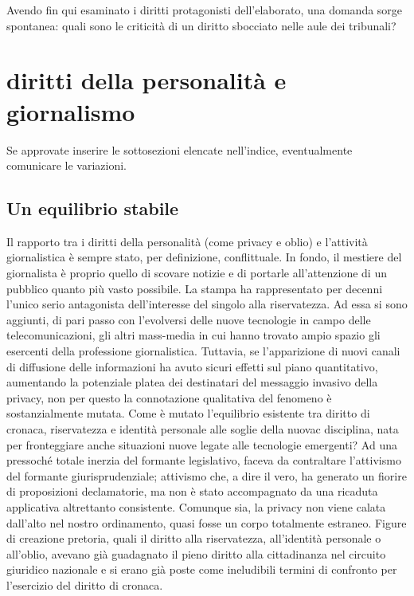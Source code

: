Avendo fin qui esaminato i diritti protagonisti dell'elaborato, una domanda sorge spontanea: quali sono le criticità di un diritto sbocciato nelle aule dei tribunali?



\section{diritti della personalità e giornalismo}
Se approvate inserire le sottosezioni elencate nell'indice, eventualmente comunicare le variazioni.

\subsection{Un equilibrio stabile}

Il rapporto tra i diritti della personalità (come privacy e oblio) e l'attività giornalistica è sempre stato, per definizione, conflittuale.
In fondo, il mestiere del giornalista è proprio quello di scovare notizie e di portarle all'attenzione di un pubblico quanto più vasto possibile.
La stampa ha rappresentato per decenni l'unico serio antagonista dell'interesse del singolo alla riservatezza. Ad essa si sono aggiunti, di pari passo con l'evolversi delle nuove tecnologie in campo delle telecomunicazioni, gli altri mass-media in cui hanno trovato ampio spazio gli esercenti della professione giornalistica. Tuttavia, se l'apparizione di nuovi canali di diffusione delle informazioni ha avuto sicuri effetti sul piano quantitativo, aumentando la potenziale platea dei destinatari del messaggio invasivo della privacy, non per questo la connotazione qualitativa del fenomeno è sostanzialmente mutata.
Come è mutato l'equilibrio esistente tra diritto di cronaca, riservatezza e identità personale alle soglie della nuovac disciplina, nata per fronteggiare anche situazioni nuove legate alle tecnologie emergenti?
Ad una pressoché totale inerzia del formante legislativo, faceva da contraltare l'attivismo del formante giurisprudenziale; attivismo che, a dire il vero, ha generato un fiorire di proposizioni declamatorie, ma non è stato accompagnato da una ricaduta applicativa altrettanto consistente.
Comunque sia, la privacy non viene calata dall'alto nel nostro ordinamento, quasi fosse un corpo totalmente estraneo. Figure di creazione pretoria, quali il diritto alla riservatezza, all'identità personale o all'oblio, avevano già guadagnato il pieno diritto alla cittadinanza nel circuito giuridico nazionale e si erano già poste come ineludibili termini di confronto per l'esercizio del diritto di cronaca.
